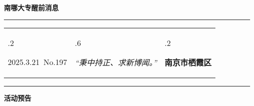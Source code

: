 \documentclass[letterpaper, 12pt]{article}
\begin{document}
\begin{center}
    \Huge\textbf{南哪大专醒前消息}
\end{center}
\vspace{4mm}
\hrule
\renewcommand\tabularxcolumn[1]{m{#1}}
\begin{tabularx}{\textwidth}{>{\hsize.2\hsize}X>{\hsize.6\hsize}X>{\hsize.2\hsize}X}
    \begin{flushleft}
        2025.3.21\, No.197
    \end{flushleft}
    &
    \begin{center}
        \textit{“秉中持正、求新博闻。”}
    \end{center}
    &
    \begin{flushright}
        \textbf{南京市栖霞区}
    \end{flushright}
\end{tabularx}
\vspace{-3.5mm}
\hrule
\vspace{4mm}
\centerline{\huge\textbf{活动预告}}
\end{document}
